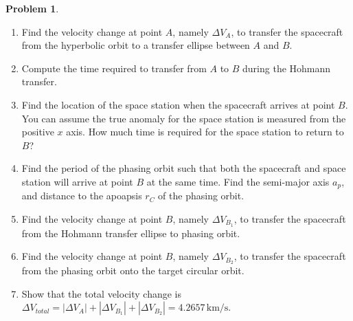 \documentclass[10pt]{article}
\theoremstyle{definition}
\newtheorem{prob}{Problem}[section]
\newenvironment{subprob}%
{\renewcommand{\theenumi}{\alph{enumi}}\renewcommand{\labelenumi}{(\theenumi)}\begin{enumerate}}%
{\end{enumerate}}%
\begin{document}
\begin{prob}
\begin{subprob}
\item Find the velocity change at point $A$, namely $\Delta V_{A}$, to transfer the spacecraft from the hyperbolic orbit to a transfer ellipse between $A$ and $B$.
\item Compute the time required to transfer from $A$ to $B$ during the Hohmann transfer.
\item Find the location of the space station when the spacecraft arrives at point $B$.
    You can assume the true anomaly for the space station is measured from the positive \( x \) axis.
   How much time is required for the space station to  return to $B$?
\item Find the period of the phasing orbit such that both the spacecraft and space station will arrive at point \( B \) at the same time.
    Find the semi-major axis $a_p$, and distance to the apoapsis $r_C$ of the phasing orbit.
\item Find the velocity change at point $B$, namely $\Delta V_{B_1}$, to transfer the spacecraft from the Hohmann transfer ellipse to phasing orbit.
\item Find the velocity change at point $B$, namely $\Delta V_{B_2}$, to transfer the spacecraft from the phasing orbit onto the target circular orbit.
\item Show that the total velocity change is $\Delta V_{total} = |\Delta V_A| + |\Delta V_{B_1}| +|\Delta V_{B_2}|=4.2657\,\mathrm{km/s}$.
\end{subprob}


\end{prob}
\end{document}
